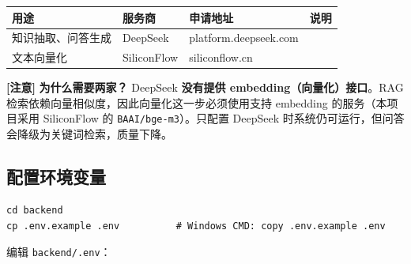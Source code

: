 \documentclass[UTF8,a4paper,11pt]{ctexrep}
\newcommand{\warnmark}{\textcolor{todobar}{\textbf{[注意]}}}
\begin{document}
\begin{center}
\small
\begin{tabularx}{\linewidth}{@{}XXXX@{}}
\toprule
用途 & 服务商 & 申请地址 & 说明 \\
\midrule
知识抽取、问答生成 & DeepSeek & platform.deepseek.com &  \\
文本向量化 & SiliconFlow & siliconflow.cn &  \\
\bottomrule
\end{tabularx}
\end{center}
\begin{todobox}
\warnmark{} \textbf{为什么需要两家？} DeepSeek \textbf{没有提供 embedding（向量化）接口}。RAG 检索依赖向量相似度，因此向量化这一步必须使用支持 embedding 的服务（本项目采用 SiliconFlow 的 \texttt{BAAI/bge-m3}）。只配置 DeepSeek 时系统仍可运行，但问答会降级为关键词检索，质量下降。

\end{todobox}


\subsection{配置环境变量}

\begin{Verbatim}[breaklines=true,breakanywhere=true,fontsize=\small,frame=single,framesep=4pt,rulecolor=\color{codeframe}]
cd backend
cp .env.example .env          # Windows CMD: copy .env.example .env
\end{Verbatim}

编辑 \texttt{backend/.env}：
\end{document}
